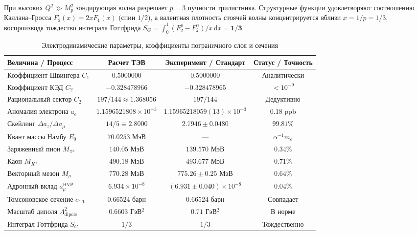 \documentclass[11pt,a4paper]{article}
\theoremstyle{definition}
\theoremstyle{remark}
\begin{document}
При высоких $Q^2 \gg M_p^2$ зондирующая волна разрешает $p=3$ пучности трилистника. Структурные функции удовлетворяют соотношению Каллана--Гросса $F_2(x) = 2x F_1(x)$ (спин $1/2$), а валентная плотность стоячей волны концентрируется вблизи $x = 1/p = 1/3$, воспроизводя тождество интеграла Готтфрида $S_G = \int_0^1 (F_2^p - F_2^n)/x \, \mathrm{d}x = \mathbf{1/3}$.

\begin{table}[H]
\centering
\small
\caption{Электродинамические параметры, коэффициенты пограничного слоя и сечения}
\label{tab:scattering_qed}
\vspace{2mm}
\begin{tabular}{lccc}
\toprule
\textbf{Величина / Процесс} & \textbf{Расчет ТЭВ} & \textbf{Эксперимент / Стандарт} & \textbf{Статус / Точность} \\
\midrule
Коэффициент Швингера $C_1$ & $0.5000000$ & $0.5000000$ & Аналитически \\
Коэффициент КЭД $C_2$ & $-0.328478966$ & $-0.328478965$ & $< 10^{-9}$ \\
Рациональный сектор $C_2$ & $197/144 \approx 1.368056$ & $197/144$ & Дедуктивно \\
Аномалия электрона $a_e$ & $1.1596521808 \times 10^{-3}$ & $1.15965218059(13)\times 10^{-3}$ & $0.18\text{ ppb}$ \\
Скейлинг $\Delta a_\tau / \Delta a_\mu$ & $14/5 \equiv 2.8000$ & $2.7946 \pm 0.0480$ & $99.81\%$ \\
\midrule
Квант массы Намбу $E_0$ & $70.0253$ МэВ & --- & $\alpha^{-1} m_e$ \\
Заряженный пион $M_{\pi^\pm}$ & $140.05$ МэВ & $139.570$ МэВ & $0.34\%$ \\
Каон $M_{K^\pm}$ & $490.18$ МэВ & $493.677$ МэВ & $0.71\%$ \\
Векторный мезон $M_\rho$ & $770.28$ МэВ & $775.26 \pm 0.25$ МэВ & $0.64\%$ \\
Адронный вклад $a_\mu^{\mathrm{HVP}}$ & $6.934 \times 10^{-8}$ & $(6.931 \pm 0.040)\times 10^{-8}$ & $0.04\%$ \\
\midrule
Томсоновское сечение $\sigma_{\mathrm{Th}}$ & $0.66524$ барн & $0.66524$ барн & Совпадает \\
Масштаб диполя $\Lambda_{\mathrm{dipole}}^2$ & $0.6603$ ГэВ$^2$ & $0.71$ ГэВ$^2$ & В норме \\
Интеграл Готтфрида $S_G$ & $1/3$ & $1/3$ & Тождественно \\
\bottomrule
\end{tabular}
\end{table}
\end{document}
